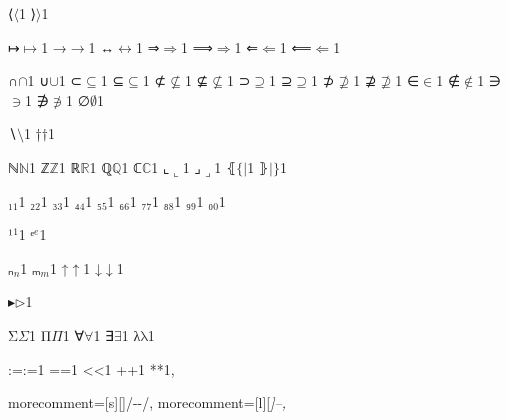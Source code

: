 {%
{⟨}{{\ensuremath{\langle}}}1
{⟩}{{\ensuremath{\rangle}}}1

{↦}{{\ensuremath{\mapsto}}}1
{→}{{\ensuremath{\rightarrow}}}1
{↔}{{\ensuremath{\leftrightarrow}}}1
{⇒}{{\ensuremath{\Rightarrow}}}1
{⟹}{{\ensuremath{\Longrightarrow}}}1
{⇐}{{\ensuremath{\Leftarrow}}}1
{⟸}{{\ensuremath{\Longleftarrow}}}1

{∩}{{\ensuremath{\cap}}}1
{∪}{{\ensuremath{\cup}}}1
{⊂}{{\ensuremath{\subseteq}}}1
{⊆}{{\ensuremath{\subseteq}}}1
{⊄}{{\ensuremath{\nsubseteq}}}1
{⊈}{{\ensuremath{\nsubseteq}}}1
{⊃}{{\ensuremath{\supseteq}}}1
{⊇}{{\ensuremath{\supseteq}}}1
{⊅}{{\ensuremath{\nsupseteq}}}1
{⊉}{{\ensuremath{\nsupseteq}}}1
{∈}{{\ensuremath{\in}}}1
{∉}{{\ensuremath{\notin}}}1
{∋}{{\ensuremath{\ni}}}1
{∌}{{\ensuremath{\notni}}}1
{∅}{{\ensuremath{\emptyset}}}1

{∖}{{\ensuremath{\setminus}}}1
{†}{{\ensuremath{\dag}}}1

{ℕ}{{\ensuremath{\mathbb{N}}}}1
{ℤ}{{\ensuremath{\mathbb{Z}}}}1
{ℝ}{{\ensuremath{\mathbb{R}}}}1
{ℚ}{{\ensuremath{\mathbb{Q}}}}1
{ℂ}{{\ensuremath{\mathbb{C}}}}1
{⌞}{{\ensuremath{\llcorner}}}1
{⌟}{{\ensuremath{\lrcorner}}}1
{⦃}{{\ensuremath{\{\!\!|}}}1
{⦄}{{\ensuremath{|\!\!\}}}}1

{₁}{{\ensuremath{_1}}}1
{₂}{{\ensuremath{_2}}}1
{₃}{{\ensuremath{_3}}}1
{₄}{{\ensuremath{_4}}}1
{₅}{{\ensuremath{_5}}}1
{₆}{{\ensuremath{_6}}}1
{₇}{{\ensuremath{_7}}}1
{₈}{{\ensuremath{_8}}}1
{₉}{{\ensuremath{_9}}}1
{₀}{{\ensuremath{_0}}}1

{¹}{{\ensuremath{^1}}}1
{ᵉ}{{\ensuremath{^e}}}1

{ₙ}{{\ensuremath{_n}}}1
{ₘ}{{\ensuremath{_m}}}1
{↑}{{\ensuremath{\uparrow}}}1
{↓}{{\ensuremath{\downarrow}}}1

{▸}{{\ensuremath{\triangleright}}}1

{Σ}{{\color{symbolcolor}\ensuremath{\Sigma}}}1
{Π}{{\color{symbolcolor}\ensuremath{\Pi}}}1
{∀}{{\color{symbolcolor}\ensuremath{\forall}}}1
{∃}{{\color{symbolcolor}\ensuremath{\exists}}}1
{λ}{{\color{symbolcolor}\ensuremath{\mathrm{\lambda}}}}1

{:=}{{\color{symbolcolor}:=}}1
{=}{{\color{symbolcolor}=}}1
{<}{{\color{symbolcolor}<}}1
{+}{{\color{symbolcolor}+}}1
{*}{{\color{symbolcolor}*}}1,

morecomment=[s][\color{commentcolor}]{/-}{-/},
morecomment=[l][\itshape \color{commentcolor}]{--},

}
